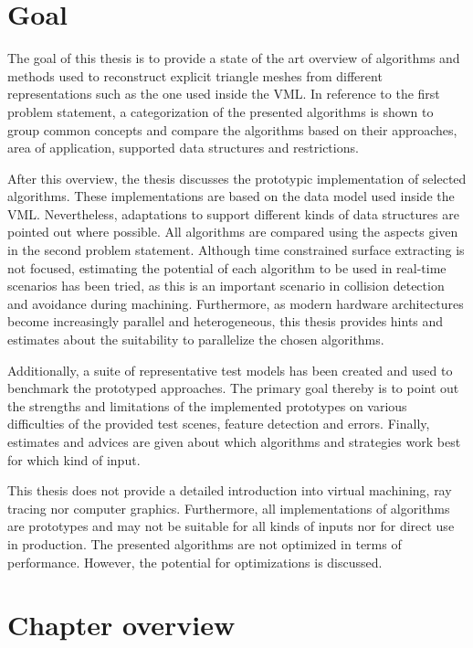 \section{Goal}
\label{sec:goal}

The goal of this thesis is to provide a state of the art overview of algorithms and methods used to reconstruct explicit triangle meshes from different representations such as the one used inside the VML.
In reference to the first problem statement, a categorization of the presented algorithms is shown to group common concepts and compare the algorithms based on their approaches, area of application, supported data structures and restrictions.

After this overview, the thesis discusses the prototypic implementation of selected algorithms.
These implementations are based on the data model used inside the VML.
Nevertheless, adaptations to support different kinds of data structures are pointed out where possible.
All algorithms are compared using the aspects given in the second problem statement.
Although time constrained surface extracting is not focused, estimating the potential of each algorithm to be used in real-time scenarios has been tried, as this is an important scenario in collision detection and avoidance during machining.
Furthermore, as modern hardware architectures become increasingly parallel and heterogeneous, this thesis provides hints and estimates about the suitability to parallelize the chosen algorithms.

Additionally, a suite of representative test models has been created and used to benchmark the prototyped approaches.
The primary goal thereby is to point out the strengths and limitations of the implemented prototypes on various difficulties of the provided test scenes, \eg feature detection and errors.
Finally, estimates and advices are given about which algorithms and strategies work best for which kind of input.

This thesis does not provide a detailed introduction into virtual machining, ray tracing nor computer graphics.
Furthermore, all implementations of algorithms are prototypes and may not be suitable for all kinds of inputs nor for direct use in production.
The presented algorithms are not optimized in terms of performance.
However, the potential for optimizations is discussed.


\section{Chapter overview}
\label{sec:chapter_overview}

